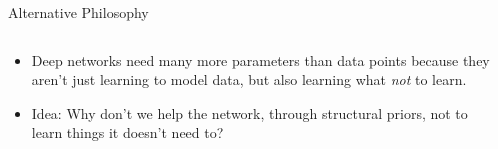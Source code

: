 \documentclass[t,xcolor=dvipsnames]{beamer}
\begin{document}
\begin{frame}{Alternative Philosophy}
\begin{columns}[onlytextwidth,T]
\begin{column}{0.65\textwidth}
\begin{itemize}
    \item Deep networks need many more parameters than data points because they aren't just learning to model data, but also learning what \emph{\color{blue}not} to learn. 
    \item Idea: Why don't we help the network, through structural priors, not to learn things it doesn't need to?
\end{itemize}
\end{column}
\begin{column}{0.34\textwidth}

\end{column}
\end{columns}
\end{frame}
\end{document}
